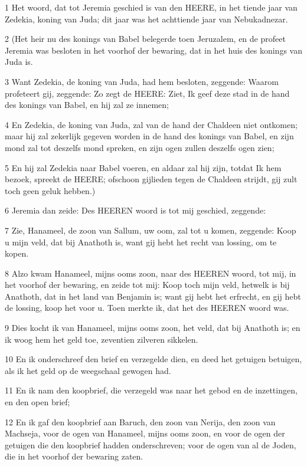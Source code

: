 \par 1 Het woord, dat tot Jeremia geschied is van den HEERE, in het tiende jaar van Zedekia, koning van Juda; dit jaar was het achttiende jaar van Nebukadnezar.
\par 2 (Het heir nu des konings van Babel belegerde toen Jeruzalem, en de profeet Jeremia was besloten in het voorhof der bewaring, dat in het huis des konings van Juda is.
\par 3 Want Zedekia, de koning van Juda, had hem besloten, zeggende: Waarom profeteert gij, zeggende: Zo zegt de HEERE: Ziet, Ik geef deze stad in de hand des konings van Babel, en hij zal ze innemen;
\par 4 En Zedekia, de koning van Juda, zal van de hand der Chaldeen niet ontkomen; maar hij zal zekerlijk gegeven worden in de hand des konings van Babel, en zijn mond zal tot deszelfs mond spreken, en zijn ogen zullen deszelfs ogen zien;
\par 5 En hij zal Zedekia naar Babel voeren, en aldaar zal hij zijn, totdat Ik hem bezoek, spreekt de HEERE; ofschoon gijlieden tegen de Chaldeen strijdt, gij zult toch geen geluk hebben.)
\par 6 Jeremia dan zeide: Des HEEREN woord is tot mij geschied, zeggende:
\par 7 Zie, Hanameel, de zoon van Sallum, uw oom, zal tot u komen, zeggende: Koop u mijn veld, dat bij Anathoth is, want gij hebt het recht van lossing, om te kopen.
\par 8 Alzo kwam Hanameel, mijns ooms zoon, naar des HEEREN woord, tot mij, in het voorhof der bewaring, en zeide tot mij: Koop toch mijn veld, hetwelk is bij Anathoth, dat in het land van Benjamin is; want gij hebt het erfrecht, en gij hebt de lossing, koop het voor u. Toen merkte ik, dat het des HEEREN woord was.
\par 9 Dies kocht ik van Hanameel, mijns ooms zoon, het veld, dat bij Anathoth is; en ik woog hem het geld toe, zeventien zilveren sikkelen.
\par 10 En ik onderschreef den brief en verzegelde dien, en deed het getuigen betuigen, als ik het geld op de weegschaal gewogen had.
\par 11 En ik nam den koopbrief, die verzegeld was naar het gebod en de inzettingen, en den open brief;
\par 12 En ik gaf den koopbrief aan Baruch, den zoon van Nerija, den zoon van Machseja, voor de ogen van Hanameel, mijns ooms zoon, en voor de ogen der getuigen die den koopbrief hadden onderschreven; voor de ogen van al de Joden, die in het voorhof der bewaring zaten.
